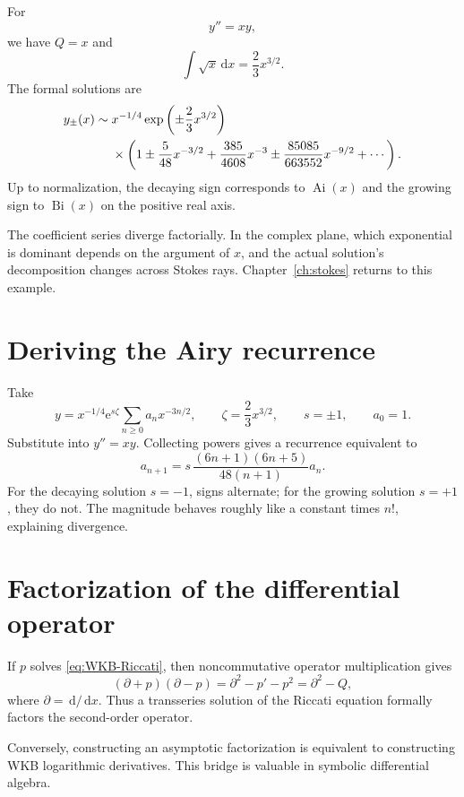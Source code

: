 \documentclass[11pt,openany]{book}
\theoremstyle{definition}
\theoremstyle{plain}
\theoremstyle{remark}
\newcommand{\dd}{\,\mathrm{d}}
\newcommand{\e}{\mathrm{e}}
\newcommand{\asym}{\sim}
\DeclareMathOperator{\Ai}{Ai}
\DeclareMathOperator{\Bi}{Bi}
\begin{document}
For
\begin{equation}\label{eq:Airy}
 y''=xy,
\end{equation}
we have $Q=x$ and
\[
 \int\sqrt{x}\dd x=\frac23x^{3/2}.
\]
The formal solutions are
\begin{align}\label{eq:Airy-WKB}
 y_{\pm}(x)\asym{}&x^{-1/4}
 \exp\left(\pm\frac23x^{3/2}\right)\\
 &\times\left(
 1\pm\frac5{48}x^{-3/2}
 +\frac{385}{4608}x^{-3}
 \pm\frac{85085}{663552}x^{-9/2}
 +\cdots\right).
\notag
\end{align}
Up to normalization, the decaying sign corresponds to $\Ai(x)$ and the growing sign to $\Bi(x)$ on the positive real axis.

The coefficient series diverge factorially. In the complex plane, which exponential is dominant depends on the argument of $x$, and the actual solution's decomposition changes across Stokes rays. Chapter~\ref{ch:stokes} returns to this example.

\section{Deriving the Airy recurrence}

Take
\[
 y=x^{-1/4}\e^{s\zeta}
 \sum_{n\ge0}a_nx^{-3n/2},
 \qquad
 \zeta=\frac23x^{3/2},
 \qquad s=\pm1,
 \qquad a_0=1.
\]
Substitute into $y''=xy$. Collecting powers gives a recurrence equivalent to
\begin{equation}\label{eq:Airy-recurrence}
 a_{n+1}=s\,
 \frac{(6n+1)(6n+5)}{48(n+1)}a_n.
\end{equation}
For the decaying solution $s=-1$, signs alternate; for the growing solution $s=+1$, they do not. The magnitude behaves roughly like a constant times $n!$, explaining divergence.

\section{Factorization of the differential operator}

If $p$ solves \cref{eq:WKB-Riccati}, then noncommutative operator multiplication gives
\begin{equation}\label{eq:operator-factorization}
 (\partial+p)(\partial-p)
 =\partial^2-p'-p^2
 =\partial^2-Q,
\end{equation}
where $\partial=\dd/\dd x$. Thus a transseries solution of the Riccati equation formally factors the second-order operator.

Conversely, constructing an asymptotic factorization is equivalent to constructing WKB logarithmic derivatives. This bridge is valuable in symbolic differential algebra.
\end{document}
